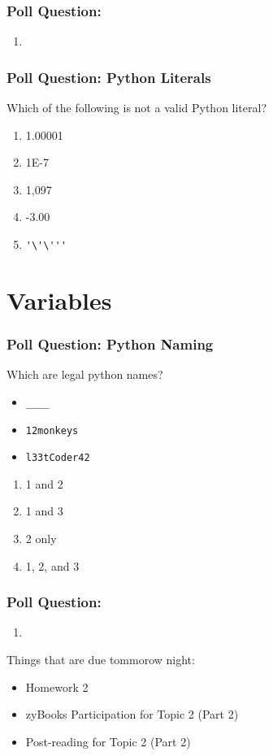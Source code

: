 \documentclass{beamer}
\begin{document}
%
%
%
\begin{frame}[fragile]
  \frametitle{Poll Question: }

  \vfill
  \begin{enumerate}
    \item
  \end{enumerate}
\end{frame}


%
%
%
\begin{frame}[fragile]
  \frametitle{Poll Question: Python Literals}
  Which of the following is not a valid Python literal?
  \begin{enumerate}[A]
    \item 1.00001
    \item 1E-7
    \item 1,097
    \item -3.00
    \item \lstinline{'\'\'''}
  \end{enumerate}
\end{frame}




\section{Variables}

%
%
%
\begin{frame}[fragile]
  \frametitle{Poll Question: Python Naming}
  \begin{minipage}{0.49\textwidth}
    Which are legal python names?
    \begin{itemize}
      \item \lstinline{____}
      \item \lstinline{12monkeys}
      \item \lstinline{l33tCoder42}
    \end{itemize}
  \end{minipage}
  \begin{minipage}{0.49\textwidth}
    \begin{enumerate}[A]
      \item 1 and 2
      \item 1 and 3
      \item 2 only
      \item 1, 2, and 3
    \end{enumerate}
  \end{minipage}
\end{frame}

%
%
%
\begin{frame}[fragile]
  \frametitle{Poll Question: }

  \vfill
  \begin{enumerate}
    \item
  \end{enumerate}
\end{frame}


%
%
%
\begin{frame}
  Things that are due tommorow night:
    \begin{itemize}
      \item Homework 2
      \item zyBooks Participation for Topic 2 (Part 2) 
      \item Post-reading for Topic 2 (Part 2)
    \end{itemize}
\end{frame}
\end{document}
